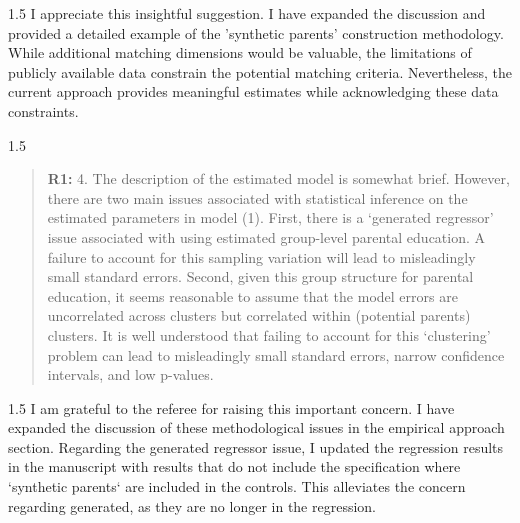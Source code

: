 \documentclass[12pt,english]{article}
\newcommand{\rrxspc}{1.5}
\begin{document}
\begin{refsection}
    \begin{spacing}{\rrxspc}
            I appreciate this insightful suggestion. I have expanded the discussion and provided a detailed example of the 'synthetic parents' construction methodology. While additional matching dimensions would be valuable, the limitations of publicly available data constrain the potential matching criteria. Nevertheless, the current approach provides meaningful estimates while acknowledging these data constraints.
    \end{spacing}
    
    \begin{spacing}{\rrxspc}
        \begin{quotation}
            \textbf{R1: } 4. The description of the estimated model is somewhat brief. However, there are two main issues associated with statistical inference on the estimated parameters in model (1). First, there is a ‘generated regressor’ issue associated with using estimated group-level parental education. A failure to account for this sampling variation will lead to misleadingly small standard errors. Second, given this group structure for parental education, it seems reasonable to assume that the model errors are uncorrelated across clusters but correlated within (potential parents) clusters. It is well understood that failing to account for this ‘clustering’ problem can lead to misleadingly small standard errors, narrow confidence intervals, and low p-values.
        \end{quotation}
    \end{spacing}

    \begin{spacing}{\rrxspc}
        I am grateful to the referee for raising this important concern. I have expanded the discussion of these methodological issues in the empirical approach section. Regarding the generated regressor issue, I updated the regression results in the manuscript with results that do not include the specification where ‘synthetic parents‘ are included in the controls. This alleviates the concern regarding generated, as they are no longer in the regression.
    \end{spacing}


\end{refsection}
\end{document}

